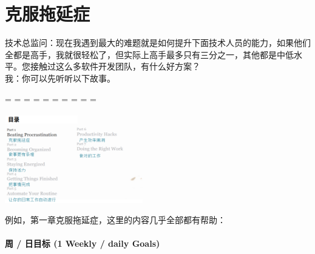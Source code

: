\chapter{克服拖延症} %


技术总监问：现在我遇到最大的难题就是如何提升下面技术人员的能力，如果他们全都是高手，我就很轻松了，但实际上高手最多只有三分之一，其他都是中低水平。您接触过这么多软件开发团队，有什么好方案？\\
我：你可以先听听以下故事。\\

\begin{description}
\tightlist
\item[]
= = = = = = = = = =
\end{description}




\includegraphics[width=6cm]{Screenshotfrom2023-10-1523-05-00.png}

例如，第一章克服拖延症，这里的内容几乎全部都有帮助：\\



\hypertarget{ux6839ux56e0ux5206ux6790ux8befux89e3ux6848ux4f8b}{%
\subsubsection{周 / 日目标 (1 Weekly / daily Goals)}\label{ux6839ux56e0ux5206ux6790ux8befux89e3ux6848ux4f8b}}



